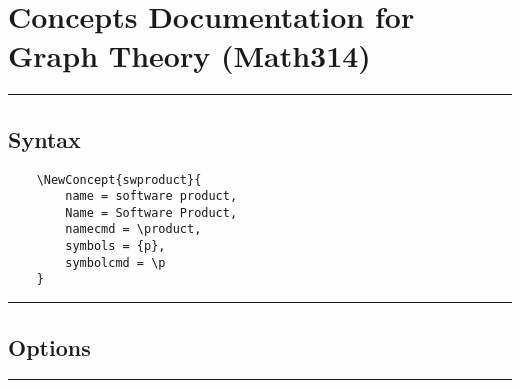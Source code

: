 \documentclass[10pt]{article}
\begin{document}
\section{Concepts Documentation for Graph Theory (Math314)}
\vspace{0.10in}
\hrule
\vspace{0.25in}
\subsection{Syntax}


\begin{verbatim}
	\NewConcept{swproduct}{
	    name = software product,  
	    Name = Software Product,    
	    namecmd = \product,          
	    symbols = {p},               
	    symbolcmd = \p                 
	}
\end{verbatim}

\vspace{0.25in}
\hrule
\vspace{0.10in}

\pagebreak

\subsection{Options}

\vspace{0.10in}
\hrule
\vspace{0.10in}
\end{document}
